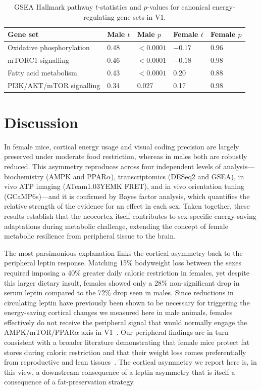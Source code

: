 \documentclass[11pt]{article}
\begin{document}
\begin{table}[htbp]
\centering
\caption{GSEA Hallmark pathway $t$-statistics and $p$-values for canonical energy-regulating gene sets in V1.}
\label{tab:gsea}
\begin{tabular}{lllll}
\toprule
Gene set & Male $t$ & Male $p$ & Female $t$ & Female $p$ \\
\midrule
Oxidative phosphorylation & 0.48 & $<0.0001$ & $-0.17$ & 0.96 \\
mTORC1 signalling & 0.46 & $<0.0001$ & $-0.18$ & 0.98 \\
Fatty acid metabolism & 0.43 & $<0.0001$ & 0.20 & 0.88 \\
PI3K/AKT/mTOR signalling & 0.34 & 0.027 & 0.17 & 0.98 \\
\bottomrule
\end{tabular}
\end{table}

\section{Discussion}

In female mice, cortical energy usage and visual coding precision are largely preserved under moderate food restriction, whereas in males both are robustly reduced. This asymmetry reproduces across four independent levels of analysis---biochemistry (AMPK and PPAR$\alpha$), transcriptomics (DESeq2 and GSEA), in vivo ATP imaging (ATeam1.03YEMK FRET), and in vivo orientation tuning (GCaMP6s)---and it is confirmed by Bayes factor analysis, which quantifies the relative strength of the evidence for an effect in each sex. Taken together, these results establish that the neocortex itself contributes to sex-specific energy-saving adaptations during metabolic challenge, extending the concept of female metabolic resilience from peripheral tissue to the brain.

The most parsimonious explanation links the cortical asymmetry back to the peripheral leptin response. Matching 15\% bodyweight loss between the sexes required imposing a 40\% greater daily caloric restriction in females, yet despite this larger dietary insult, females showed only a 28\% non-significant drop in serum leptin compared to the 72\% drop seen in males. Since reductions in circulating leptin have previously been shown to be necessary for triggering the energy-saving cortical changes we measured here in male animals, females effectively do not receive the peripheral signal that would normally engage the AMPK/mTOR/PPAR$\alpha$ axis in V1~\citep{zhang1994positional, steinberg2023ampk, laplante2013mtorc1, lopezdominguez2016omega3}. Our peripheral findings are in turn consistent with a broader literature demonstrating that female mice protect fat stores during caloric restriction and that their weight loss comes preferentially from reproductive and lean tissues~\citep{lovdel2024hsd11b1, greenfield2025lifespan, jeromson2024gdf15, ryu2023timerestricted}. The cortical asymmetry we report here is, in this view, a downstream consequence of a leptin asymmetry that is itself a consequence of a fat-preservation strategy.
\end{document}
